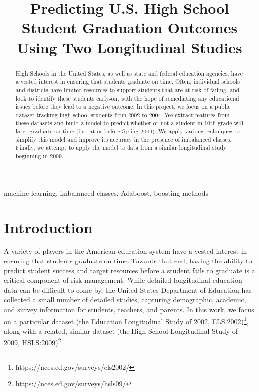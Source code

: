 \documentclass[conference]{IEEEtran}
\begin{document}
\title{Predicting U.S. High School Student Graduation Outcomes Using Two Longitudinal Studies\\
}

\author{
}

\maketitle

\begin{abstract}
High Schools in the United States, as well as state and federal education agencies, have a vested interest in ensuring that
students graduate on time. Often, individual schools and districts have limited resources to support students that are at risk
of failing, and look to identify these students early-on, with the hope of remediating any educational issues before they
lead to a negative outcome. In this project, we focus on a public dataset tracking high school students from 2002 to 2004.
We extract features from these datasets and build a model to predict whether or not a student in 10th grade will later graduate
on-time (i.e., at or before Spring 2004). We apply various techniques to simplify this model and improve its accuracy in the presence
of imbalanced classes. Finally, we attempt to apply the model to data from a similar longitudinal study beginning in 2009.
\end{abstract}

\begin{IEEEkeywords}
machine learning, imbalanced classes, Adaboost, boosting methods
\end{IEEEkeywords}

\section{Introduction}
A variety of players in the American education system have a vested interest in ensuring that students graduate on time. Towards that
end, having the ability to predict student success and target resources before a student fails to graduate is a critical component of risk
management. While detailed longitudinal education data can be difficult to come by, the United States Department of Education has 
collected a small number of detailed studies, capturing demographic, academic, and survey information for students, teachers, and
parents. In this work, we focus on a particular dataset (the Education Longitudinal Study of 2002, ELS:2002)\footnote{https://nces.ed.gov/surveys/els2002/}, along with a related, similar dataset
(the High School Longitudinal Study of 2009, HSLS:2009)\footnote{https://nces.ed.gov/surveys/hsls09/}. \\
\end{document}
